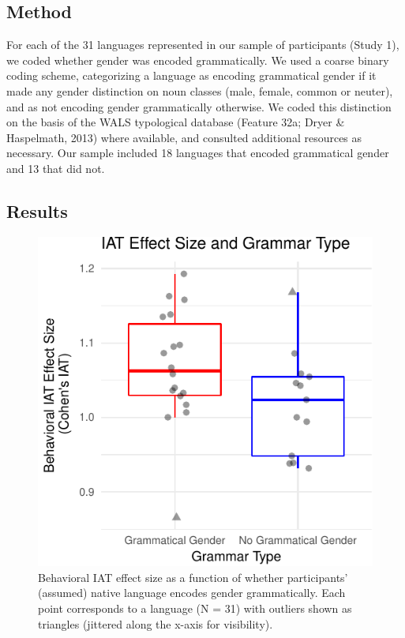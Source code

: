 \documentclass[10pt, letterpaper]{article}
\newenvironment{CodeChunk}{}{}
\begin{document}
\subsection{Method}\label{method-3}

For each of the 31 languages represented in our sample of participants
(Study 1), we coded whether gender was encoded grammatically. We used a
coarse binary coding scheme, categorizing a language as encoding
grammatical gender if it made any gender distinction on noun classes
(male, female, common or neuter), and as not encoding gender
grammatically otherwise. We coded this distinction on the basis of the
WALS typological database (Feature 32a; Dryer \& Haspelmath, 2013) where
available, and consulted additional resources as necessary. Our sample
included 18 languages that encoded grammatical gender and 13 that did
not.

\subsection{Results}\label{results-3}

\begin{CodeChunk}
\begin{figure}[t]

{\centering \includegraphics{figs/grammatical_gender_plot-1} 

}

\caption[Behavioral IAT effect size as a function of whether participants' (assumed) native language encodes gender grammatically]{Behavioral IAT effect size as a function of whether participants' (assumed) native language encodes gender grammatically. Each point corresponds to a language (N = 31) with outliers shown as triangles (jittered along the x-axis for visibility).}\label{fig:grammatical_gender_plot}
\end{figure}
\end{CodeChunk}
\end{document}
